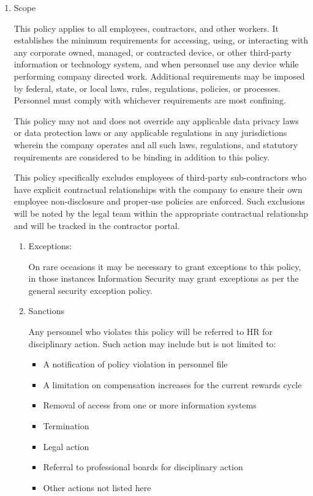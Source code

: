 \documentclass[stu]{apa7}
\begin{document}
\begin{enumerate}
\item Scope
\label{sec:orgd421bed}

This policy applies to all employees, contractors, and other workers. It establishes the minimum requirements for accessing, using, or interacting with any corporate owned, managed, or contracted device, or other third-party information or technology system, and when personnel use any device while performing company directed work. Additional requirements may be imposed by federal, state, or local laws, rules, regulations, policies, or processes. Personnel must comply with whichever requirements are most confining.

This policy may not and does not override any applicable data privacy laws or data protection laws or any applicable regulations in any jurisdictions wherein the company operates and all such laws, regulations, and statutory requirements are considered to be binding in addition to this policy.

This policy specifically excludes employees of third-party sub-contractors who have explicit contractual relationships with the company to ensure their own employee non-disclosure and proper-use policies are enforced. Such exclusions will be noted by the legal team within the appropriate contractual relationshp and will be tracked in the contractor portal.

\begin{enumerate}
\item Exceptions:
\label{sec:org0bc8aa2}

On rare occasions it may be necessary to grant exceptions to this policy, in those instances Information Security may grant exceptions as per the general security exception policy.

\item Sanctions
\label{sec:org214eeec}

Any personnel who violates this policy will be referred to HR for disciplinary action. Such action may include but is not limited to:

\begin{itemize}
\item A notification of policy violation in personnel file
\item A limitation on compensation increases for the current rewards cycle
\item Removal of access from one or more information systems
\item Termination
\item Legal action
\item Referral to professional boards for disciplinary action
\item Other actions not listed here
\end{itemize}
\end{enumerate}


\end{enumerate}
\end{document}
